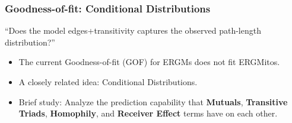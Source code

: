 \documentclass[aspectratio=169, 9pt]{beamer}
\begin{document}
\begin{frame}[c]
	\frametitle{Goodness-of-fit: Conditional Distributions}
	
	\begin{center}
	\begin{minipage}[m]{.6\linewidth}
		\centering\Large
		``Does the model edges+transitivity captures the observed path-length distribution?''
	\end{minipage}	
	\end{center}\pause
	
	\begin{itemize}
		\item The current Goodness-of-fit (GOF) for ERGMs does not fit ERGMitos.\pause
		\item A closely related idea: Conditional Distributions.\pause
		\item Brief study: Analyze the prediction capability that \textbf{Mutuals}, \textbf{Transitive Triads}, \textbf{Homophily}, and \textbf{Receiver Effect} terms have on each other.\pause
	\end{itemize}
	
\begin{figure}
	
	\centering
	\def\svgwidth{.6\linewidth}
	
	\label{fig:maxout-gof-chapter}
\end{figure}
\end{frame}
\end{document}
